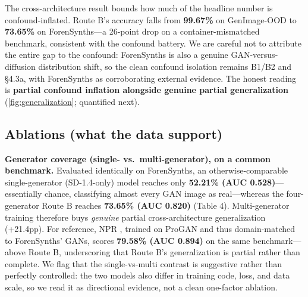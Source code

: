 

The cross-architecture result bounds how much of the headline number is confound-inflated. Route B's accuracy falls from \textbf{99.67\%} on GenImage-OOD to \textbf{73.65\%} on ForenSynths---a 26-point drop on a container-mismatched benchmark, consistent with the confound battery. We are careful not to attribute the entire gap to the confound: ForenSynths is also a genuine GAN-versus-diffusion distribution shift, so the clean confound isolation remains B1/B2 and \S{}4.3a, with ForenSynths as corroborating external evidence. The honest reading is \textbf{partial confound inflation alongside genuine partial generalization} (\autoref{fig:generalization}; quantified next).



\subsection{Ablations (what the data support)}

\textbf{Generator coverage (single- vs.~multi-generator), on a common benchmark.} Evaluated identically on ForenSynths, an otherwise-comparable single-generator (SD-1.4-only) model reaches only \textbf{52.21\% (AUC 0.528)}---essentially chance, classifying almost every GAN image as real---whereas the four-generator Route B reaches \textbf{73.65\% (AUC 0.820)} (Table 4). Multi-generator training therefore buys \emph{genuine} partial cross-architecture generalization (+21.4pp). For reference, NPR \citep{tan2024npr}, trained on ProGAN and thus domain-matched to ForenSynths' GANs, scores \textbf{79.58\% (AUC 0.894)} on the same benchmark---above Route B, underscoring that Route B's generalization is partial rather than complete. We flag that the single-vs-multi contrast is suggestive rather than perfectly controlled: the two models also differ in training code, loss, and data scale, so we read it as directional evidence, not a clean one-factor ablation.



